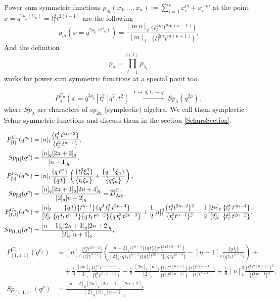 \documentclass{article}
\def\nn{\nonumber}
\def\Adj{\text{Adj}}
\def\nn{\nonumber}
\begin{document}
Power sum symmetric functions $p_m (x_1,\dots, x_n) := \sum_{i=1}^n x_i^m+x_i^{-m}$ at the point $x = q^{2\rho_k(C_n)} = t_l^2 t^{2(i-1)}$ are the following
\begin{equation}
    p_m \left(x = q^{2\rho_k(C_n)} \right) = \frac{[m\,n]_t}{[m]_t} \frac{\{t_l^{4m}t^{2m(n-1)}\}}{\{t_l^{2m}t^{m(n-1)}\}}.
\end{equation}
And the definition
\begin{equation}
    p_{\lambda} = \prod_{i=1}^{l(\lambda)} p_{\lambda_i}
\end{equation}
works for power sum symmetric functions at a special point too.

\begin{equation}
   P_{\lambda}^{C_n}\left(x = q^{2\rho_k}\,|\,t_l^2 \,|\, q^2, t^2\right)  \,\, \xrightarrow[]{t\,\rightarrow\, q,\, t_l \rightarrow\, q} \,\, Sp_{\lambda}(q^{2\rho}),
\end{equation}
where $Sp_{\lambda}$ are characters of $sp_{2n}$ (symplectic) algebra. We call them symplectic Schur symmetric functions and discuss them in the section \ref{SchursSection}.


\begin{align}
   P_{[1]}^{C_n}(q^{\rho_k}) & = [n]_t  \frac{\{t_l^4\,t^{2n-2}\}}{\{t_l^2\,t^{n-1}\}},
       \\
   Sp_{[1]}(q^\rho) & = \frac{[n]_q[2n+2]_q}{[n+1]_q},  \\
 P_{[2]}^{C_n}(q^{\rho_k}) & = [n]_t{\{q\,t^n\}\over\{q\,t\}}\left({\{t_l^3\xi_n^3\} \over \{t_l\xi_n\}}+{\{q^{-1} \xi_n\}\over \{q\xi_n\}}\right),
     \\
   Sp_{[2]}(q^\rho) & = \frac{[n]_q[2n+1]_q[2n+4]_q}{[2]_q[n+2]_q} =  \overline{D}^{C_n}_{\Adj} ,   \\
   P_{[1,1]}^{C_n}(q^{\rho_k}) & =    \frac{[n]_t}{[2]_t} \frac{\{q\,t\}\{t^{n-1}\} \{q^2 \, t_l^2 \, t^{2n-4}\}}{\{q\,t_l\,t^{n-1}\}\{q\,t_l\,t^{n-2}\}\{q\,t_l^2\,t^{2n-3}\}} +
   \frac{1}{2} [n]_t^2 \frac{\{t_l^4 t^{2n-2}\}^2}{\{t_l^2 t^{n-1}\}^2}
   - \frac{1}{2} \frac{[2n]_t}{[2]_t} \frac{\{ t_l^8\,t^{4n-4}\}}{\{ t_l^4\,t^{2n-2}\}},  \\
Sp_{[1,1]}(q^\rho) & = \frac{[n-1]_q[2n+1]_q[2n+2]_q}{[2]_q[n+1]_q}, 
\end{align}
\begin{align}
    P_{[1,1,1]}^{C_n} (q^{\rho_k}) & = [n]_t \frac{\{t_l^4 t^{2n-2}\}}{\{t_l^2 t^{n-1}\}}  \left( \frac{[n-2]_t\{t^{n-1}\}\{q\,t\}\{q^2 t_l^2 t^{2(n-3)}\}}{[2]_t\{q\,t_l\,t^{n-2}\}\{q\,t_l^2 t^{2n-5}\}\{q\,t_lt^{n-3}\}} -[n-1]_t \frac{\{q\,t_l\}}{\{q\,t_l\,t^{n-2}\}} \right) + \\
\nn & \quad + \frac{1}{3}\,\frac{[3n]_t}{[3]_t} \frac{\{ t_l^{12}\,t^{6(n-1)}\}}{\{ t_l^6\,t^{3(n-1)}\}}-\frac{1}{2}\,\frac{[2n]_t\,[n]_t}{[2]_t} \frac{\{ t_l^8\,t^{4(n-1)}\}}{\{ t_l^4\,t^{2(n-1)}\}} \frac{\{t_l^4 t^{2(n-1)}\}}{\{t_l^2 t^{n-1}\}} +\frac{1}{6}\,[n]_t^3 \frac{\{t_l^4 t^{2(n-1)}\}^3}{\{t_l^2 t^{n-1}\}^3},  \\
  Sp_{[1,1,1]}(q^\rho) & = \frac{[n-2]_q[2n]_q[2n+1]_q[2n+2]_q}{[2]_q[3]_q[n+1]_q} 
\end{align}
\end{document}
